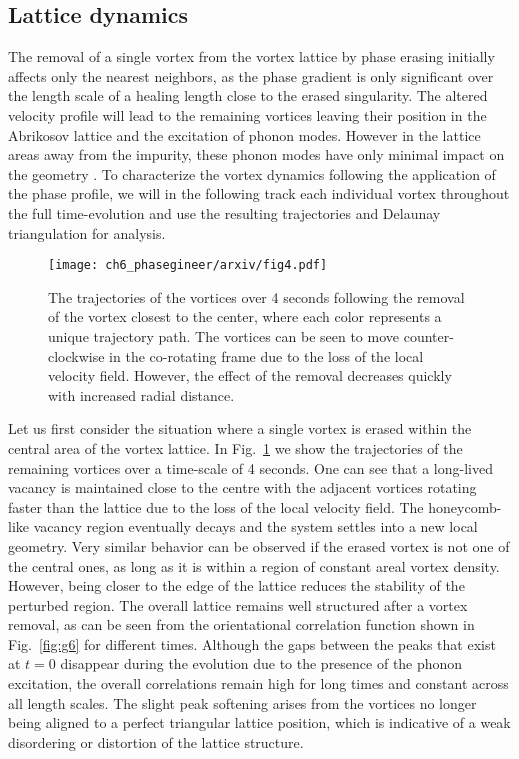 \subsection{Lattice dynamics}


The removal of a single vortex from the vortex lattice by phase erasing initially affects only the nearest neighbors, as the phase gradient is only significant over the length scale of a healing length close to the erased singularity. The altered velocity profile will lead to the remaining vortices leaving their position in the Abrikosov lattice and the excitation of phonon modes. However in the lattice areas away from the impurity, these phonon modes have only minimal impact on the geometry \cite{VTX:oriordan_pra_2016}. To characterize the vortex dynamics following the application of the phase profile, we will in the following track each individual vortex throughout the full time-evolution and use the resulting trajectories and Delaunay triangulation for analysis.

\begin{figure}[h!]\centering
\texttt{[image: ch6\_phasegineer/arxiv/fig4.pdf]}
    \caption{The trajectories of the vortices over 4 seconds following the removal of the vortex closest to the center, where each color represents a unique trajectory path. The vortices can be seen to move counter-clockwise in the co-rotating frame due to the loss of the local velocity field. However, the effect of the removal decreases quickly with increased radial distance. }
    \label{fig:trajplot}
\end{figure}

Let us first consider the situation where a single vortex is erased within the central area of the vortex lattice. In Fig.~\ref{fig:trajplot} we show the trajectories of the remaining vortices over a time-scale of 4 seconds. One can see that a long-lived vacancy is maintained close to the centre with the adjacent vortices rotating faster than the lattice due to the loss of the local velocity field. The honeycomb-like vacancy region eventually decays and the system settles into a new local geometry. Very similar behavior can be observed if the erased vortex is not one of the central ones, as long as it is within a region of constant areal vortex density. However, being closer to the edge of the lattice reduces the stability of the perturbed region. The overall lattice remains well structured after a vortex removal, as can be seen from the orientational correlation function shown in Fig.~\ref{fig:g6} for different times. Although the gaps between the peaks that exist at $t=0$ disappear during the evolution due to the presence of the phonon excitation, the overall correlations remain high for long times and constant across all length scales. The slight peak softening arises from the vortices no longer being aligned to a perfect triangular lattice position, which is indicative of a weak disordering or distortion of the lattice structure.

